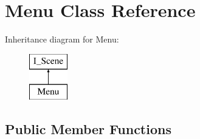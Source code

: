 \hypertarget{class_menu}{}\section{Menu Class Reference}
\label{class_menu}
Inheritance diagram for Menu\+:\begin{figure}[H]
\begin{center}
\leavevmode
\includegraphics[height=2.000000cm]{class_menu}
\end{center}
\end{figure}
\subsection*{Public Member Functions}
